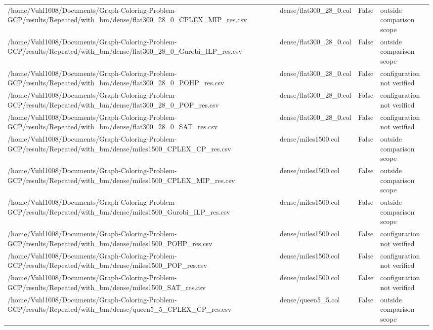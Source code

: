 \begin{table}[htbp]
\begin{tabular}{llll}
/home/Vuhl1008/Documents/Graph-Coloring-Problem-GCP/results/Repeated/with\_bm/dense/flat300\_28\_0\_CPLEX\_MIP\_res.csv & dense/flat300\_28\_0.col & False & outside comparison scope \\
/home/Vuhl1008/Documents/Graph-Coloring-Problem-GCP/results/Repeated/with\_bm/dense/flat300\_28\_0\_Gurobi\_ILP\_res.csv & dense/flat300\_28\_0.col & False & outside comparison scope \\
/home/Vuhl1008/Documents/Graph-Coloring-Problem-GCP/results/Repeated/with\_bm/dense/flat300\_28\_0\_POHP\_res.csv & dense/flat300\_28\_0.col & False & configuration not verified \\
/home/Vuhl1008/Documents/Graph-Coloring-Problem-GCP/results/Repeated/with\_bm/dense/flat300\_28\_0\_POP\_res.csv & dense/flat300\_28\_0.col & False & configuration not verified \\
/home/Vuhl1008/Documents/Graph-Coloring-Problem-GCP/results/Repeated/with\_bm/dense/flat300\_28\_0\_SAT\_res.csv & dense/flat300\_28\_0.col & False & configuration not verified \\
/home/Vuhl1008/Documents/Graph-Coloring-Problem-GCP/results/Repeated/with\_bm/dense/miles1500\_CPLEX\_CP\_res.csv & dense/miles1500.col & False & outside comparison scope \\
/home/Vuhl1008/Documents/Graph-Coloring-Problem-GCP/results/Repeated/with\_bm/dense/miles1500\_CPLEX\_MIP\_res.csv & dense/miles1500.col & False & outside comparison scope \\
/home/Vuhl1008/Documents/Graph-Coloring-Problem-GCP/results/Repeated/with\_bm/dense/miles1500\_Gurobi\_ILP\_res.csv & dense/miles1500.col & False & outside comparison scope \\
/home/Vuhl1008/Documents/Graph-Coloring-Problem-GCP/results/Repeated/with\_bm/dense/miles1500\_POHP\_res.csv & dense/miles1500.col & False & configuration not verified \\
/home/Vuhl1008/Documents/Graph-Coloring-Problem-GCP/results/Repeated/with\_bm/dense/miles1500\_POP\_res.csv & dense/miles1500.col & False & configuration not verified \\
/home/Vuhl1008/Documents/Graph-Coloring-Problem-GCP/results/Repeated/with\_bm/dense/miles1500\_SAT\_res.csv & dense/miles1500.col & False & configuration not verified \\
/home/Vuhl1008/Documents/Graph-Coloring-Problem-GCP/results/Repeated/with\_bm/dense/queen5\_5\_CPLEX\_CP\_res.csv & dense/queen5\_5.col & False & outside comparison scope \\

\end{tabular}
\end{table}
